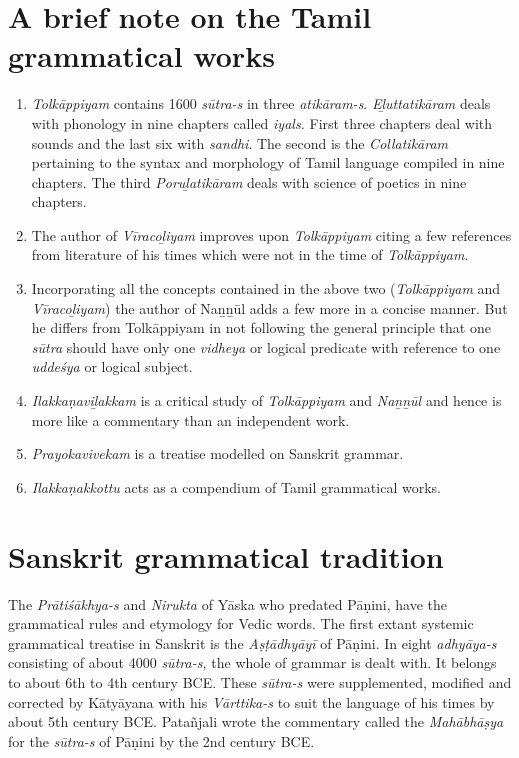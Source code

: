\section*{A brief note on the Tamil grammatical works}

\begin{enumerate}[{\rm 1)}]
\itemsep=0pt
\item \textit{Tolkāppiyam} contains 1600 \textit{sūtra-s} in three \textit{atikāram-s}. \textit{Eḻuttatikāram} deals with phonology in nine chapters called \textit{iyals.} First three chapters deal with sounds and the last six with \textit{sandhi}. The second is the \textit{Collatikāram} pertaining to the syntax and morphology of Tamil language compiled in nine chapters. The third \textit{Poruḻatikāram} deals with science of poetics in nine chapters.

 \item The author of \textit{Vīracoḻiyam} improves upon \textit{Tolkāppiyam} citing a few references from literature of his times which were not in the time of \textit{Tolkāppiyam}.

 \item Incorporating all the concepts contained in the above two (\textit{Tolkāppiyam} and \textit{Vīracoḻiyam}) the author of Naṉṉūl adds a few more in a concise manner. But he differs from Tolkāppiyam in not following the general principle that one \textit{sūtra} should have only one \textit{vidheya} or logical predicate with reference to one \textit{uddeśya} or logical subject.

 \item \textit{Ilakkaṇaviḻakkam} is a critical study of \textit{Tolkāppiyam} and \textit{Naṉṉūl} and hence is more like a commentary than an independent work.

 \item \textit{Prayokavivekam} is a treatise modelled on Sanskrit grammar.

 \item \textit{Ilakkaṇakkottu} acts as a compendium of Tamil grammatical works.

\end{enumerate}


\section*{Sanskrit grammatical tradition}

The \textit{Prātiśākhya-s} and \textit{Nirukta} of Yāska who predated Pāṇini, have the grammatical rules and etymology for Vedic words. The first extant systemic grammatical treatise in Sanskrit is the \textit{Aṣṭādhyāyī} of Pāṇini. In eight \textit{adhyāya-s} consisting of about 4000 \textit{sūtra-s,} the whole of grammar is dealt with. It belongs to about 6th to 4th century BCE. These \textit{sūtra-s} were supplemented, modified and corrected by Kātyāyana with his \textit{Vārttika-s} to suit the language of his times by about 5th century BCE. Patañjali wrote the commentary called the \textit{Mahābhāṣya} for the \textit{sūtra-s} of Pāṇini by the 2nd century BCE.

